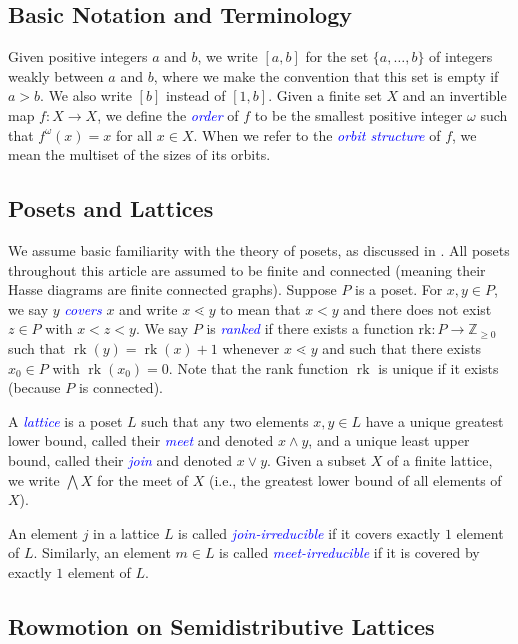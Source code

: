 \documentclass[11pt]{amsart}
\theoremstyle{definition}
\DeclareMathOperator{\rk}{rk}
\newcommand{\dfn}[1]{\textcolor{blue}{\emph{#1}}}
\begin{document}
\subsection{Basic Notation and Terminology}
Given positive integers $a$ and $b$, we write $[a,b]$ for the set $\{a,\ldots,b\}$ of integers weakly between $a$ and $b$, where we make the convention that this set is empty if $a>b$. We also write $[b]$ instead of $[1,b]$. Given a finite set $X$ and an invertible map $f\colon X\to X$, we define the \dfn{order} of $f$ to be the smallest positive integer $\omega$ such that $f^\omega(x)=x$ for all $x\in X$. When we refer to the \dfn{orbit structure} of $f$, we mean the multiset of the sizes of its orbits. 

\subsection{Posets and Lattices}\label{subsec:posets}
We assume basic familiarity with the theory of posets, as discussed in \cite[Chapter~3]{Stanley2}. All posets throughout this article are assumed to be finite and connected (meaning their Hasse diagrams are finite connected graphs). Suppose $P$ is a poset. For $x,y\in P$, we say $y$ \dfn{covers} $x$ and write $x\lessdot y$ to mean that $x<y$ and there does not exist $z\in P$ with $x<z<y$. We say $P$ is \dfn{ranked} if there exists a function $\text{rk}\colon P\to\mathbb Z_{\geq 0}$ such that $\rk(y)=\rk(x)+1$ whenever $x\lessdot y$ and such that there exists $x_0\in P$ with $\rk(x_0)=0$. Note that the rank function $\rk$ is unique if it exists (because $P$ is connected). 

A \dfn{lattice} is a poset $L$ such that any two elements $x,y\in L$ have a unique greatest lower bound, called their \dfn{meet} and denoted $x\wedge y$, and a unique least upper bound, called their \dfn{join} and denoted $x\vee y$. Given a subset $X$ of a finite lattice, we write $\bigwedge X$ for the meet of $X$ (i.e., the greatest lower bound of all elements of $X$). 

An element $j$ in a lattice $L$ is called \dfn{join-irreducible} if it covers exactly $1$ element of $L$. Similarly, an element $m\in L$ is called \dfn{meet-irreducible} if it is covered by exactly $1$ element of $L$. 

\subsection{Rowmotion on Semidistributive Lattices}\label{subsec:distributive}
\end{document}
